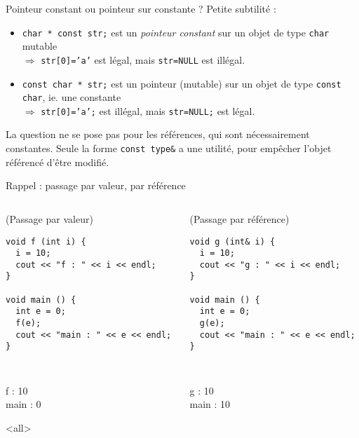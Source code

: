 \documentclass[c]{beamer}
\newcommand{\inline}[1]{\texttt{#1}}
\begin{document}
\begin{frame}[fragile]{Pointeur constant ou pointeur sur constante ?}
Petite subtilité :
\begin{itemize}
  \item \inline{char * const str;} est un \textit{pointeur constant} sur un objet de type \inline{char} mutable\\
  $\Rightarrow$ \inline{str[0]='a'} est légal, mais \inline{str=NULL} est illégal.
  \item \inline{const char * str;} est un pointeur (mutable) sur un objet de type \inline{const char}, ie. une constante\\
  $\Rightarrow$ \inline{str[0]='a';} est illégal, mais \inline{str=NULL;} est légal.
\end{itemize}
\vspace{1em}
\pause
La question ne se pose pas pour les références, qui sont nécessairement constantes. Seule la forme \inline{const type&} a une utilité, pour empêcher l'objet référencé d'être modifié.
\end{frame}


\begin{frame}[fragile]{Rappel : passage par valeur, par référence}
 \begin{columns}
\begin{column}{0.5\columnwidth}
\begin{cbox}[][lwuc][\footnotesize](Passage par valeur)
\begin{verbatim}
void f (int i) {
  i = 10;
  cout << "f : " << i << endl;
}

void main () {
  int e = 0;
  f(e);
  cout << "main : " << e << endl;
}
\end{verbatim}

\tt
\begin{cbox}
f : 10\\
main : 0
\end{cbox}

\onslide<all>
\end{cbox}
\end{column}
\begin{column}{0.5\columnwidth}
\begin{cbox}[][lwuc][\footnotesize](Passage par référence)
\begin{verbatim}
void g (int& i) {
  i = 10;
  cout << "g : " << i << endl;
}

void main () {
  int e = 0;
  g(e);
  cout << "main : " << e << endl;
}
\end{verbatim}

\tt
\begin{cbox}
g : 10\\
main : 10
\end{cbox}
\end{cbox}
\end{column}
\end{columns}
\end{frame}
\end{document}
